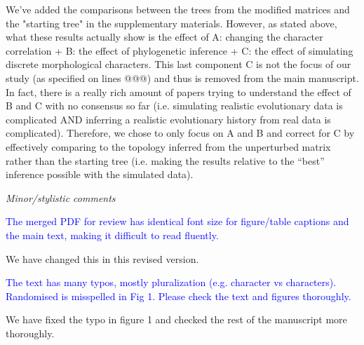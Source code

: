 \documentclass[12pt,letterpaper]{article}
\renewcommand{\subsection}[1]{%
\bigskip
\begin{center}
\begin{large}
\normalfont\itshape #1
\end{large}
\end{center}}
\begin{document}
We’ve added the comparisons between the trees from the modified matrices and the "starting tree" in the supplementary materials.
However, as stated above, what these results actually show is the effect of A: changing the character correlation + B: the effect of phylogenetic inference + C: the effect of simulating discrete morphological characters. This last component C is not the focus of our study (as specified on lines @@@) and thus is removed from the main manuscript. In fact, there is a really rich amount of papers trying to understand the effect of B and C with no consensus so far (i.e. simulating realistic evolutionary data is complicated AND inferring a realistic evolutionary history from real data is complicated). Therefore, we chose to only focus on A and B and correct for C by effectively comparing to the topology inferred from the unperturbed matrix rather than the starting tree (i.e. making the results relative to the ``best'' inference possible with the simulated data). 



\subsection{Minor/stylistic comments}

\textcolor{blue}{The merged PDF for review has identical font size for figure/table captions and the main text, making it difficult to read fluently.}

We have changed this in this revised version.

\textcolor{blue}{The text has many typos, mostly pluralization (e.g. character vs characters). Randomised is misspelled in Fig 1. Please check the text and figures thoroughly.}

We have fixed the typo in figure 1 and checked the rest of the manuscript more thoroughly.



\end{document}
